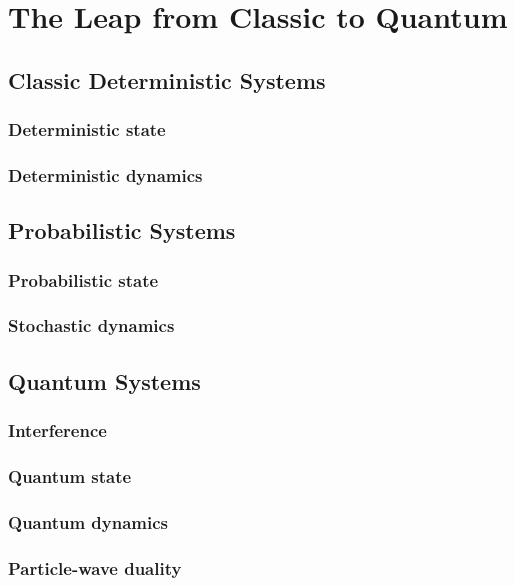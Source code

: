 \documentclass{easyclass}
\begin{document}
\else
	\chapter{The Leap from Classic to Quantum}
\fi



\section{Classic Deterministic Systems}
\subsection{Deterministic state}
\subsection{Deterministic dynamics}

\section{Probabilistic Systems}	
\subsection{Probabilistic state}
\subsection{Stochastic dynamics}

\section{Quantum Systems}
\subsection{Interference}
\subsection{Quantum state}
\subsection{Quantum dynamics}
\subsection{Particle-wave duality}


	
\ifx\flag\undefined
	
\end{document}
